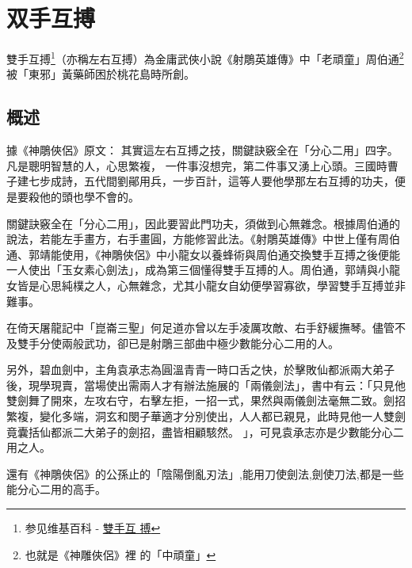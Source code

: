 \chapter{双手互搏}
雙手互搏\footnote{参见维基百科 -
  \href{http://zh.wikipedia.org/wiki/\%E5\%8F\%8C\%E6\%89\%8B\%E4\%BA\%92\%E6\%90\%8F}{雙手互
    搏}}（亦稱左右互搏）為金庸武俠小說《射鵰英雄傳》中「老頑童」周伯通\footnote{也就是《神雕俠侶》裡
  的「中頑童」}被「東邪」黃藥師困於桃花島時所創。

\section{概述}
據《神鵰俠侶》\cite{shendiao}原文： 其實這左右互搏之技，關鍵訣竅全在「分心二用」四字。凡是聰明智慧的人，心思繁複， 一件事沒想完，第二件事又湧上心頭。三國時曹子建七步成詩，五代間劉鄖用兵，一步百計，這等人要他學那左右互搏的功夫，便是要殺他的頭也學不會的。

關鍵訣竅全在「分心二用」，因此要習此門功夫，須做到心無雜念。根據周伯通的說法，若能左手畫方，右手畫圓，方能修習此法。《射鵰英雄傳》中世上僅有周伯通、郭靖能使用，《神鵰俠侶》中小龍女以養蜂術與周伯通交換雙手互搏之後便能一人使出「玉女素心劍法」，成為第三個懂得雙手互搏的人。周伯通，郭靖與小龍女皆是心思純樸之人，心無雜念，尤其小龍女自幼便學習寡欲，學習雙手互搏並非難事。

在倚天屠龍記中「崑崙三聖」何足道亦曾以左手凌厲攻敵、右手舒緩撫琴。儘管不及雙手分使兩般武功，卻已是射鵰三部曲中極少數能分心二用的人。

另外，碧血劍中，主角袁承志為圓溫青青一時口舌之快，於擊敗仙都派兩大弟子後，現學現賣，當場使出需兩人才有辦法施展的「兩儀劍法」，書中有云：「只見他雙劍舞了開來，左攻右守，右擊左拒，一招一式，果然與兩儀劍法毫無二致。劍招繁複，變化多端，洞玄和閔子華適才分別使出，人人都已親見，此時見他一人雙劍竟囊括仙都派二大弟子的劍招，盡皆相顧駭然。 」，可見袁承志亦是少數能分心二用之人。

還有《神鵰俠侶》的公孫止的「陰陽倒亂刃法」,能用刀使劍法,劍使刀法,都是一些能分心二用的高手。

